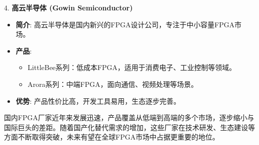 \documentclass[
  ignorenonframetext,
  chinese,
]{beamer}
\providecommand{\tightlist}{%
  \setlength{\itemsep}{0pt}\setlength{\parskip}{0pt}}
\begin{document}
\begin{frame}
\begin{block}{4. \textbf{高云半导体 (Gowin Semiconductor)}}
\label{ux9ad8ux4e91ux534aux5bfcux4f53-gowin-semiconductor}
\begin{itemize}
\tightlist
\item
  \textbf{简介}:
  高云半导体是国内新兴的FPGA设计公司，专注于中小容量FPGA市场。
\item
  \textbf{产品}:

  \begin{itemize}
  \tightlist
  \item
    LittleBee系列：低成本FPGA，适用于消费电子、工业控制等领域。\\
  \item
    Arora系列：中端FPGA，面向通信、视频处理等场景。\\
  \end{itemize}
\item
  \textbf{优势}: 产品性价比高，开发工具易用，生态逐步完善。
\end{itemize}
\end{block}
\end{frame}

\begin{frame}
国内FPGA厂家近年来发展迅速，产品覆盖从低端到高端的多个市场，逐步缩小与国际巨头的差距。随着国产化替代需求的增加，这些厂家在技术研发、生态建设等方面不断取得突破，未来有望在全球FPGA市场中占据更重要的地位。
\end{frame}
\end{document}
